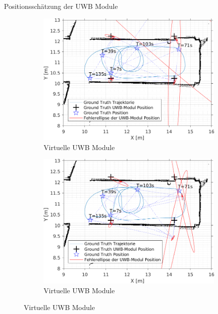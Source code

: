 \documentclass{beamer}
\begin{document}
\begin{frame}{Positionsschätzung der UWB Module}
\begin{figure}
		\par
		\bigskip
		\begin{subfigure}{0.4\linewidth}
			\centering
			\includegraphics[width=\linewidth]{Record_2018-02-08-12-33-53_filtered_5_beacon_error}
			\caption{Virtuelle UWB Module}
		\end{subfigure}
		\hfill
		\begin{subfigure}{0.4\linewidth}
			\centering
			\includegraphics[width=\linewidth]{Record_2018-02-08-12-33-53_filtered_4_beacon_error}
			\caption{Virtuelle UWB Module}
		\end{subfigure}
	\end{figure}

\end{frame}
\end{document}
